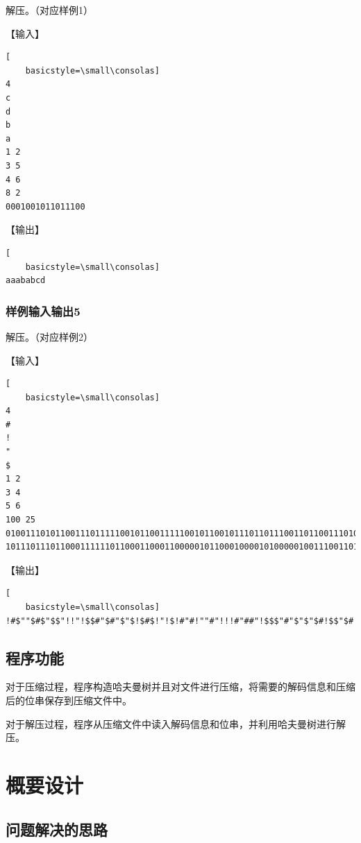 \documentclass{article}
\begin{document}
解压。（对应样例1）

【输入】

\begin{lstlisting}[
    basicstyle=\small\consolas]
4
c
d
b
a
1 2
3 5
4 6
8 2
0001001011011100
\end{lstlisting}

【输出】

\begin{lstlisting}[
    basicstyle=\small\consolas]
aaababcd
\end{lstlisting}

\subsubsection{样例输入输出5}

解压。（对应样例2）

【输入】

\begin{lstlisting}[
    basicstyle=\small\consolas]
4
#
!
"
$
1 2
3 4
5 6
100 25
010011101011001110111110010110011111001011001011101101110011011001110100100001101000100101010010000010011111111000
10111011101100011111101100011000110000010110001000010100000100111001101011011001001111
\end{lstlisting}

【输出】

\begin{lstlisting}[
    basicstyle=\small\consolas]
!#$""$#$"$$"!!"!$$#"$#"$"$!$#$!"!$!#"#!""#"!!!#"##"!$$$"#"$"$"$#!$$"$#!"#$##!!"#"#!!##!#$"!""$!"!#$$
\end{lstlisting}

\subsection{程序功能}

对于压缩过程，程序构造哈夫曼树并且对文件进行压缩，将需要的解码信息和压缩后的位串保存到压缩文件中。

对于解压过程，程序从压缩文件中读入解码信息和位串，并利用哈夫曼树进行解压。

\section{概要设计}

\subsection{问题解决的思路}
\end{document}
